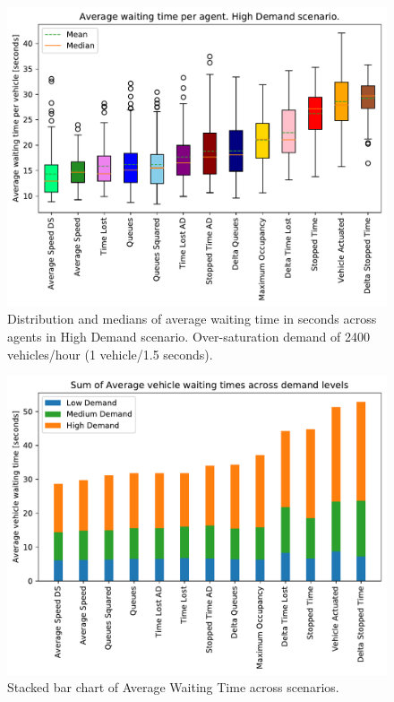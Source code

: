 \documentclass[conference]{IEEEtran}
\begin{document}
\begin{figure}[thpb]
    \centering
    \includegraphics[width=\linewidth]{figures/rand_1_5_ordered_color_DS.pdf}
    \caption{Distribution and medians of average waiting time in seconds across agents in High Demand scenario. Over-saturation demand of 2400 vehicles/hour (1 vehicle/1.5 seconds).}
    \label{fig:high}
\end{figure}

\begin{figure}[thpb]
    \centering
    \includegraphics[width=\linewidth]{figures/stacked_average_delay_ordered_by_sum_DS.pdf}
    \caption{Stacked bar chart of Average Waiting Time across scenarios.}
    \label{fig:stack}
\end{figure}
\end{document}
